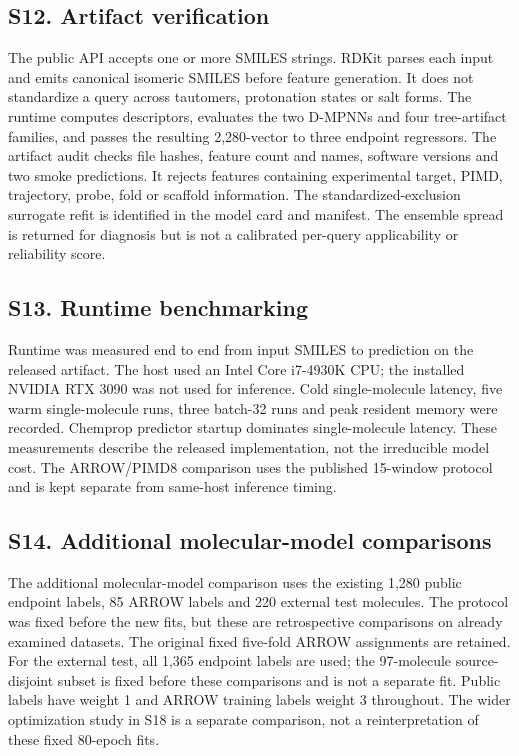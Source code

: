 \subsection*{S12. Artifact verification}

The public API accepts one or more SMILES strings. RDKit parses each input and emits
canonical isomeric SMILES before feature generation. It does not standardize a query
across tautomers, protonation states or salt forms. The runtime computes descriptors,
evaluates the two D-MPNNs and four tree-artifact families, and
passes the resulting 2,280-vector to three endpoint regressors. The artifact audit
checks file hashes, feature count and names, software versions and two smoke
predictions. It rejects features containing experimental target, PIMD, trajectory,
probe, fold or scaffold information. The standardized-exclusion surrogate refit is
identified in the model card and manifest. The ensemble spread is returned for
diagnosis but is not a calibrated per-query applicability or reliability score.

\subsection*{S13. Runtime benchmarking}

Runtime was measured end to end from input SMILES to prediction on the released
artifact. The host used an Intel Core i7-4930K CPU; the installed NVIDIA RTX 3090 was
not used for inference. Cold single-molecule latency, five warm single-molecule
runs, three batch-32 runs and peak resident memory were recorded. Chemprop predictor
startup dominates single-molecule latency. These measurements describe the released
implementation, not the irreducible model cost. The ARROW/PIMD8 comparison uses the
published 15-window protocol and is kept separate from same-host inference timing.

\subsection*{S14. Additional molecular-model comparisons}

The additional molecular-model comparison uses the existing 1,280 public endpoint labels,
85 ARROW labels and 220 external test molecules. The protocol was fixed before the
new fits, but these are retrospective comparisons on already examined datasets.
The original fixed five-fold ARROW assignments are retained. For the external test,
all 1,365 endpoint labels are used; the 97-molecule source-disjoint subset is fixed
before these comparisons and is not a separate fit. Public labels have weight 1 and
ARROW training labels weight 3 throughout. The wider optimization study in S18
is a separate comparison, not a reinterpretation of these fixed 80-epoch fits.

